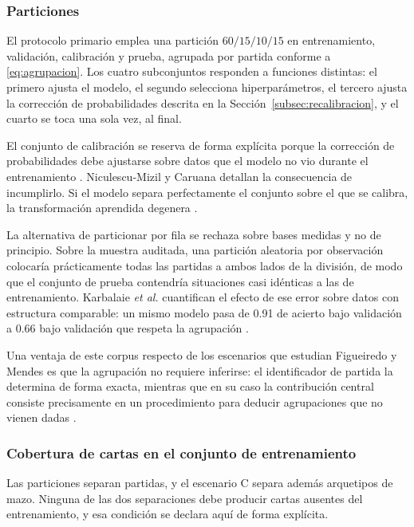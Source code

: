 \subsubsection{Particiones}

El protocolo primario emplea una partición $60/15/10/15$ en entrenamiento,
validación, calibración y prueba, agrupada por partida conforme a
\eqref{eq:agrupacion}. Los cuatro subconjuntos responden a funciones
distintas: el primero ajusta el modelo, el segundo selecciona
hiperparámetros, el tercero ajusta la corrección de probabilidades descrita
en la Sección~\ref{subsec:recalibracion}, y el cuarto se toca una sola vez,
al final.

El conjunto de calibración se reserva de forma explícita porque la
corrección de probabilidades debe ajustarse sobre datos que el modelo no vio
durante el entrenamiento \cite{silvafilho_calibration_2023}. Niculescu-Mizil
y Caruana detallan la consecuencia de incumplirlo. Si el modelo separa
perfectamente el conjunto sobre el que se calibra, la transformación
aprendida degenera \cite{niculescumizil_probabilities_2005}.

La alternativa de particionar por fila se rechaza sobre bases medidas y no
de principio. Sobre la muestra auditada, una partición aleatoria por
observación colocaría prácticamente todas las partidas a ambos lados de la
división, de modo que el conjunto de prueba contendría situaciones casi
idénticas a las de entrenamiento. Karbalaie \textit{et al.} cuantifican el
efecto de ese error sobre datos con estructura comparable: un mismo modelo
pasa de 0.91 de acierto bajo validación a 0.66 bajo validación
que respeta la agrupación \cite{karbalaie_participantaware_2026}.

Una ventaja de este corpus respecto de los escenarios que estudian Figueiredo
y Mendes es que la agrupación no requiere inferirse: el identificador de
partida la determina de forma exacta, mientras que en su caso la
contribución central consiste precisamente en un procedimiento para deducir
agrupaciones que no vienen dadas \cite{figueiredo_leakage_2024}.

\subsubsection{Cobertura de cartas en el conjunto de entrenamiento}

Las particiones separan partidas, y el escenario C separa además arquetipos
de mazo. Ninguna de las dos separaciones debe producir cartas ausentes del
entrenamiento, y esa condición se declara aquí de forma explícita.

